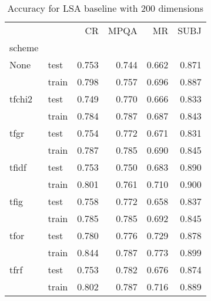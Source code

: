 \begin{table}[H]
\begin{center}

\begin{tabular}{llrrrr}
\toprule
{} &      &  CR &  MPQA &  MR &  SUBJ \\
scheme &  &            &              &            &              \\
\midrule
None & test &      0.753 &        0.744 &      0.662 &        0.871 \\
{} & train &      0.798 &        0.757 &      0.696 &        0.887 \\
tfchi2 & test &      0.749 &        0.770 &      0.666 &        0.833 \\
{} & train &      0.784 &        0.787 &      0.687 &        0.843 \\
tfgr & test &      0.754 &        0.772 &      0.671 &        0.831 \\
{} & train &      0.787 &        0.785 &      0.690 &        0.845 \\
tfidf & test &      0.753 &        0.750 &      0.683 &        0.890 \\
{} & train &      0.801 &        0.761 &      0.710 &        0.900 \\
tfig & test &      0.758 &        0.772 &      0.658 &        0.837 \\
{} & train &      0.785 &        0.785 &      0.692 &        0.845 \\
tfor & test &      0.780 &        0.776 &      0.729 &        0.878 \\
{} & train &      0.844 &        0.787 &      0.773 &        0.899 \\
tfrf & test &      0.753 &        0.782 &      0.676 &        0.874 \\
{} & train &      0.802 &        0.787 &      0.716 &        0.889 \\
\bottomrule
\end{tabular}

\caption[Accuracy for LSA baseline with 200 dimensions]{Accuracy for LSA baseline with 200 dimensions}
\label{tab:lsa:resuts:abs:200}
\end{center}
\end{table}





